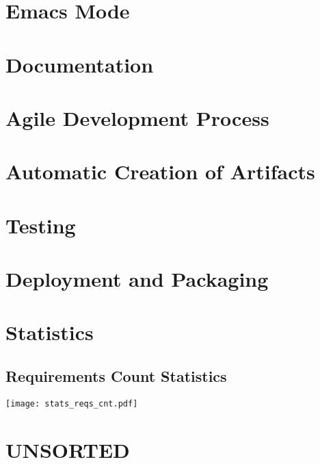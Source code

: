 \documentclass{article}
\begin{document}
\section{Emacs Mode}








\section{Documentation}










\section{Agile Development Process}



\section{Automatic Creation of Artifacts}



\section{Testing}






\section{Deployment and Packaging}



\section{Statistics}
\subsection{Requirements Count Statistics}
\texttt{[image: stats\_reqs\_cnt.pdf]}

\section{UNSORTED}














\end{document}
